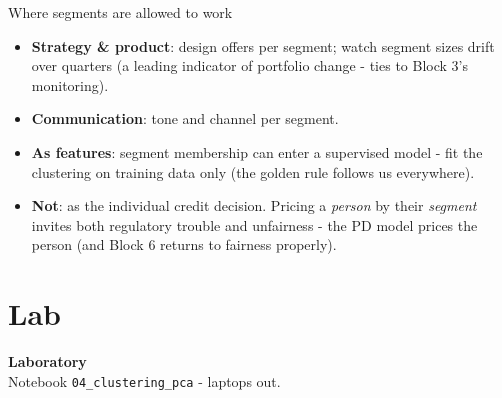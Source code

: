 \documentclass[10pt,aspectratio=169]{beamer}
\begin{document}
\begin{frame}{Where segments are allowed to work}
  \begin{itemize}
    \item \textbf{Strategy \& product}: design offers per segment; watch
          segment sizes drift over quarters (a leading indicator of
          portfolio change - ties to Block 3's monitoring).
    \item \textbf{Communication}: tone and channel per segment.
    \item \textbf{As features}: segment membership can enter a supervised
          model - fit the clustering on \alert{training data only}
          (the golden rule follows us everywhere).
    \item \textbf{Not}: as the individual credit decision. Pricing a
          \emph{person} by their \emph{segment} invites both regulatory
          trouble and unfairness - the PD model prices the person
          (and Block 6 returns to fairness properly).
  \end{itemize}
\end{frame}

\section{Lab}

\begin{frame}[plain]
  \begin{center}
    \vspace{1.5cm}
    {\LARGE\textbf{Laboratory}}\\[0.6cm]
    {\normalsize Notebook \texttt{04\_clustering\_pca} - laptops out.}
  \end{center}
\end{frame}
\end{document}
